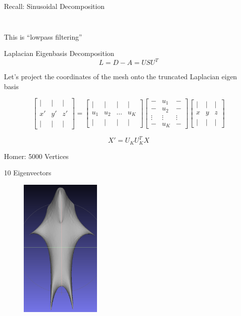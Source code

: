 \documentclass{beamer}
\begin{document}
\begin{frame}{Recall: Sinusoidal Decomposition}
\begin{columns}
\begin{column}[T]{5cm}
\begin{figure}[t]
\end{figure}
\end{column}
\end{columns}


This is ``lowpass filtering''
\end{frame}

\begin{frame}{Laplacian Eigenbasis Decomposition}
\[ L = D - A = USU^T \]

Let's project the coordinates of the mesh onto the truncated Laplacian eigen basis

\small
\[ \left[ \begin{array}{ccc} | & | & | \\ x' & y' & z' \\ | & | & | \end{array} \right] = \left[ \begin{array}{cccc} | & | & | & | \\ u_1 & u_2 & \hdots & u_K \\ | & | & | & | \end{array} \right] \left[ \begin{array}{ccc}  - & u_1 & - \\ - & u_2 & - \\ \vdots & \vdots & \vdots \\ - & u_K & - \end{array} \right] \left[ \begin{array}{ccc} | & | & | \\ x & y & z \\ | & | & |  \end{array} \right] \]

\[ X' = U_K U_K^T X \]

\end{frame}

\begin{frame}{Homer: 5000 Vertices}

10 Eigenvectors
\begin{figure}[t]
    \includegraphics[width=0.35\textwidth]{Harmonics/HomerProjections/Homer10.png}
\end{figure}

\end{frame}
\end{document}

